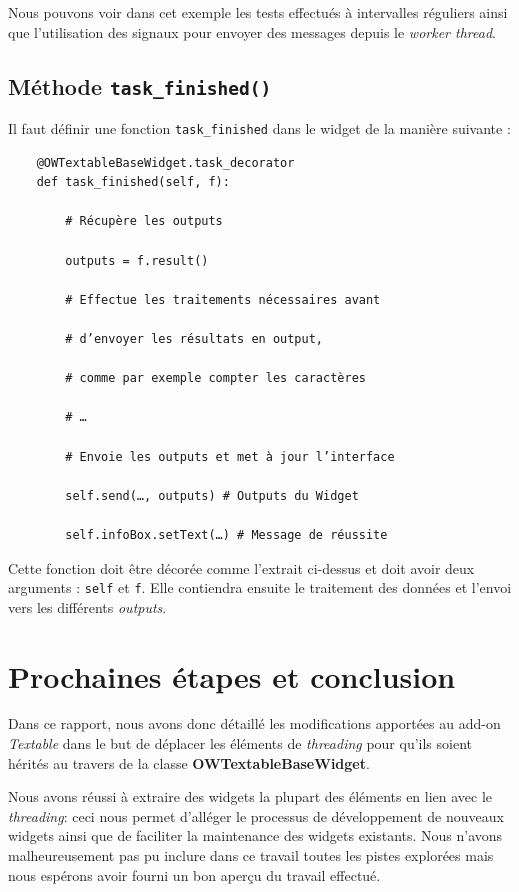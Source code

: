 \documentclass{article}
\begin{document}
Nous pouvons voir dans cet exemple les tests effectués à intervalles réguliers ainsi que l'utilisation des signaux pour envoyer des messages depuis le \textit{worker thread}.

\subsection{Méthode \texttt{task\_finished()}}

Il faut définir une fonction \texttt{task\_finished} dans le widget de la manière suivante :

\begin{verbatim}
    @OWTextableBaseWidget.task_decorator
    def task_finished(self, f):
    
        # Récupère les outputs
        
        outputs = f.result()
        
        # Effectue les traitements nécessaires avant
        
        # d’envoyer les résultats en output,
        
        # comme par exemple compter les caractères
        
        # …
        
        # Envoie les outputs et met à jour l’interface
        
        self.send(…, outputs) # Outputs du Widget
        
        self.infoBox.setText(…) # Message de réussite
\end{verbatim}

Cette fonction doit être décorée comme l'extrait ci-dessus et doit avoir deux arguments : \texttt{self} et \texttt{f}. Elle contiendra ensuite le traitement des données et l'envoi vers les différents \textit{outputs}.

\section{Prochaines étapes et conclusion}

Dans ce rapport, nous avons donc détaillé les modifications apportées au add-on \textit{Textable} dans le but de déplacer les éléments de \textit{threading} pour qu'ils soient hérités au travers de la classe \textbf{OWTextableBaseWidget}.

Nous avons réussi à extraire des widgets la plupart des éléments en lien avec le \textit{threading}: ceci nous permet d'alléger le processus de développement de nouveaux widgets ainsi que de faciliter la maintenance des widgets existants. Nous n'avons malheureusement pas pu inclure dans ce travail toutes les pistes explorées mais nous espérons avoir fourni un bon aperçu du travail effectué.
\end{document}
